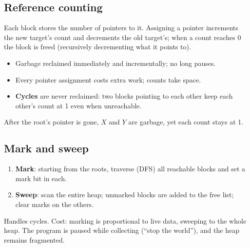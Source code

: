 \subsection{Reference counting}
Each block stores the number of pointers to it. Assigning a pointer increments the new
target's count and decrements the old target's; when a count reaches 0 the block is freed
(recursively decrementing what it points to).
\begin{itemize}
  \item[+] Garbage reclaimed immediately and incrementally; no long pauses.
  \item[$-$] Every pointer assignment costs extra work; counts take space.
  \item[$-$] \textbf{Cycles} are never reclaimed: two blocks pointing to each other keep each
        other's count at 1 even when unreachable.
\end{itemize}
\begin{center}

\small After the root's pointer is gone, $X$ and $Y$ are garbage, yet each count stays at 1.
\end{center}

\subsection{Mark and sweep}
\begin{enumerate}
  \item \textbf{Mark}: starting from the roots, traverse (DFS) all reachable blocks and set a
        mark bit in each.
  \item \textbf{Sweep}: scan the entire heap; unmarked blocks are added to the free list;
        clear marks on the others.
\end{enumerate}
Handles cycles. Cost: marking is proportional to live data, sweeping to the whole heap. The
program is paused while collecting (``stop the world''), and the heap remains fragmented.


